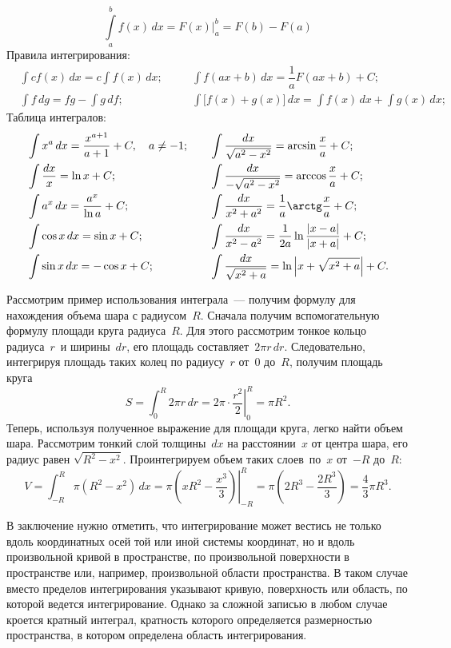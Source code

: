 \begin{equation}
	\int\limits^b_a f(x) \,d x = F(x) \biggr|^b_a = F(b) - F(a)
\end{equation}
Правила интегрирования:
\begin{align*}
	&\int c f(x) \,d x = c \int f(x) \,d x;\quad &&  \int f(ax + b) \,d x = \dfrac{1}{a}F(ax + b) + C;\\
	&\int f \,d g = fg - \int g \,d f; && \int \bigl[f(x) + g(x)\bigr] \,d x = \int f(x) \,d x + \int g(x) \,d x;
\end{align*}
Таблица интегралов:
\begin{align*}
	&\int  x^a \,d x = \dfrac{x^{a+1}}{a+1} + C,\quad a \neq -1; \quad
	&&\int \dfrac{dx}{\sqrt{a^2 - x^2}} = \arcsin\dfrac{x}{a} + C;\\
	&\int \frac{dx}{x} = \ln x + C;
	&&\int \dfrac{dx}{-\sqrt{a^2 - x^2}} = \arccos\dfrac{x}{a} + C;\\
	&\int a^x \,d x = \dfrac{a^x}{\ln a} + C;
	&&\int \dfrac{dx}{x^2 + a^2} = \dfrac{1}{a} \arctg \dfrac{x}{a} + C; \\
	&\int \cos x \,d x = \sin x + C;
	&&\int \dfrac{dx}{x^2 - a^2} = \dfrac{1}{2a} \ln \dfrac{|x - a|}{|x + a|} + C;\\
	&\int \sin x \,d x = -\cos x + C;
	&&\int \dfrac{dx}{\sqrt{x^2 + a}} = \ln \left| x + \sqrt{x^2 + a} \right| + C.
\end{align*}

Рассмотрим пример использования интеграла~--- получим формулу для нахождения объема шара с радиусом~$R$. Сначала получим вспомогательную формулу площади круга радиуса~$R$. Для этого рассмотрим тонкое кольцо радиуса~$r$~и ширины~$dr$, его площадь составляет~$2\pi r \,d r$. Следовательно, интегрируя площадь таких колец по радиусу~$r$ от~$0$ до~$R$, получим площадь круга
\begin{equation*}
    S = \int_0^R 2 \pi r \,d r = 2 \pi \cdot \left.\frac{r^2}{2} \right|_0^R = \pi R^2.
\end{equation*}
Теперь, используя полученное выражение для площади круга, легко найти объем шара. Рассмотрим тонкий слой толщины~$dx$ на расстоянии~$x$ от центра шара, его радиус равен $\sqrt{R^2 - x^2}$. Проинтегрируем объем таких слоев~по~$x$ от~$-R$ до~$R$:
\begin{equation*}
    V 
        = \int_{-R}^{R} \pi (R^2 - x^2) \,d x 
        = \pi \left.\left(xR^2 - \frac{x^3}{3}\right)\right|_{-R}^{R}
        = \pi \left(2R^3 - \frac{2R^3}{3} \right) 
        = \frac{4}{3} \pi R^3.
\end{equation*}

В заключение нужно отметить, что интегрирование может вестись не только вдоль координатных осей той или иной системы координат, но и вдоль произвольной кривой в пространстве, по произвольной поверхности в пространстве или, например, произвольной области пространства. В таком случае вместо пределов интегрирования указывают кривую, поверхность или область, по которой ведется интегрирование. Однако за сложной записью в любом случае кроется кратный интеграл, кратность которого определяется размерностью пространства, в котором определена область интегрирования.